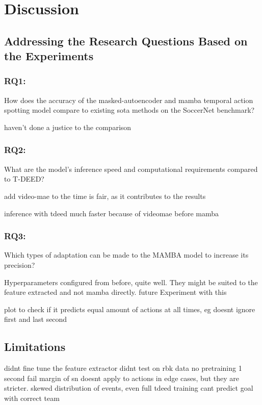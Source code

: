 \chapter{Discussion}
\label{chap:discussion}

\section{Addressing the Research Questions Based on the Experiments}


\subsection{RQ1:} 
How does the accuracy of the masked-autoencoder and mamba temporal action spotting model compare to existing \acrlong{sota} methods on the SoccerNet benchmark?

haven't done a justice to the comparison


\subsection{RQ2:} 
What are the model’s inference speed and computational requirements compared to T-DEED?

add video-mae to the time is fair, as it contributes to the results

inference with tdeed much faster because of videomae before mamba


\subsection{RQ3:}
Which types of adaptation can be made to the MAMBA model to increase its precision?

Hyperparameters configured from before, quite well. 
They might be suited to the feature extracted and not mamba directly. 
future Experiment with this


plot to check if it predicts equal amount of actions at all times, eg doesnt ignore first and last second 

\section{Limitations}
didnt fine tune the feature extractor
didnt test on rbk data
no pretraining
1 second fail margin of sn doesnt apply to actions in edge cases, but they are stricter. 
skewed distribution of events, even full tdeed training cant predict goal with correct team

